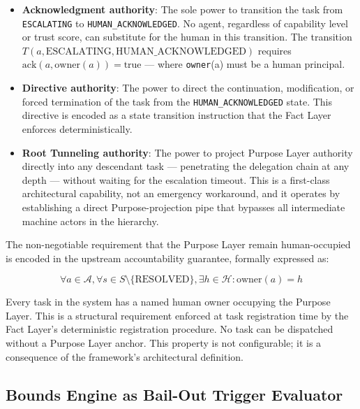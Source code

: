 \begin{itemize}
\item \textbf{Acknowledgment authority}: The sole power to transition the task from \texttt{ESCALATING} to \texttt{HUMAN\_ACKNOWLEDGED}. No agent, regardless of capability level or trust score, can substitute for the human in this transition. The transition $T(a, \text{ESCALATING}, \text{HUMAN\_ACKNOWLEDGED})$ requires $\text{ack}(a, \text{owner}(a)) = \text{true}$ — where \texttt{owner}(a) must be a human principal.

\item \textbf{Directive authority}: The power to direct the continuation, modification, or forced termination of the task from the \texttt{HUMAN\_ACKNOWLEDGED} state. This directive is encoded as a state transition instruction that the Fact Layer enforces deterministically.

\item \textbf{Root Tunneling authority}: The power to project Purpose Layer authority directly into any descendant task — penetrating the delegation chain at any depth — without waiting for the escalation timeout. This is a first-class architectural capability, not an emergency workaround, and it operates by establishing a direct Purpose-projection pipe that bypasses all intermediate machine actors in the hierarchy.
\end{itemize}

The non-negotiable requirement that the Purpose Layer remain human-occupied is encoded in the upstream accountability guarantee, formally expressed as:

\begin{equation}
\forall a \in \mathcal{A}, \forall s \in S \setminus \{\text{RESOLVED}\}, \exists h \in \mathcal{H} : \text{owner}(a) = h
\tag{G-Purpose}
\end{equation}

Every task in the system has a named human owner occupying the Purpose Layer. This is a structural requirement enforced at task registration time by the Fact Layer's deterministic registration procedure. No task can be dispatched without a Purpose Layer anchor. This property is not configurable; it is a consequence of the framework's architectural definition.

\subsection{Bounds Engine as Bail-Out Trigger Evaluator}
\label{sec:bounds-trigger}

